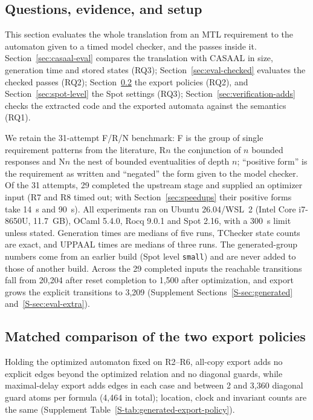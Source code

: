 \subsection{Questions, evidence, and setup}
This section evaluates the whole translation from an MTL requirement to the automaton given to a timed model checker, and the passes inside it. Section~\ref{sec:casaal-eval} compares the translation with CASAAL in size, generation time and stored states (RQ3); Section~\ref{sec:eval-checked} evaluates the checked passes (RQ2); Section~\ref{sec:export-policies} the export policies (RQ2), and Section~\ref{sec:spot-level} the Spot settings (RQ3); Section~\ref{sec:verification-adds} checks the extracted code and the exported automata against the semantics (RQ1).

We retain the 31-attempt F/R/N benchmark: F is the group of single requirement patterns from the literature, R$n$ the conjunction of $n$ bounded responses and N$n$ the nest of bounded eventualities of depth $n$; ``positive form'' is the requirement as written and ``negated'' the form given to the model checker. Of the 31 attempts, 29 completed the upstream stage and supplied an optimizer input (R7 and R8 timed out; with Section~\ref{sec:speedups} their positive forms take 14~s and 90~s). All experiments ran on Ubuntu 26.04/WSL~2 (Intel Core i7-8650U, 11.7~GB), OCaml 5.4.0, Rocq 9.0.1 and Spot 2.16, with a 300~s limit unless stated. Generation times are medians of five runs, TChecker state counts are exact, and UPPAAL times are medians of three runs. The generated-group numbers come from an earlier build (Spot level \texttt{small}) and are never added to those of another build. Across the 29 completed inputs the reachable transitions fall from 20,204 after reset completion to 1,500 after optimization, and export grows the explicit transitions to 3,209 (Supplement Sections~\ref{S-sec:generated} and~\ref{S-sec:eval-extra}).





\subsection{Matched comparison of the two export policies}
\label{sec:export-policies}
Holding the optimized automaton fixed on R2--R6, all-copy export adds no explicit edges beyond the optimized relation and no diagonal guards, while maximal-delay export adds edges in each case and between 2 and 3,360 diagonal guard atoms per formula (4,464 in total); location, clock and invariant counts are the same (Supplement Table~\ref{S-tab:generated-export-policy}).

